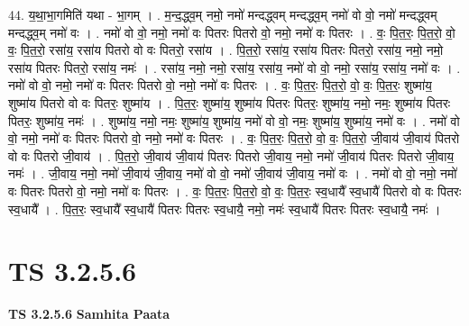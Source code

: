 \documentclass[17pt]{extarticle}
\begin{document}
44. य॒था॒भा॒गमिति॑ यथा - भा॒गम् । . म॒न्द॒द्ध्व॒म् नमो॒ नमो॑ मन्दद्ध्वम् मन्दद्ध्व॒म् नमो॑ वो वो॒ नमो॑ मन्दद्ध्वम् मन्दद्ध्व॒म् नमो॑ वः । . नमो॑ वो वो॒ नमो॒ नमो॑ वः पितरः पितरो वो॒ नमो॒ नमो॑ वः पितरः । . वः॒ पि॒त॒रः॒ पि॒त॒रो॒ वो॒ वः॒ पि॒त॒रो॒ रसा॑य॒ रसा॑य पितरो वो वः पितरो॒ रसा॑य । . पि॒त॒रो॒ रसा॑य॒ रसा॑य पितरः पितरो॒ रसा॑य॒ नमो॒ नमो॒ रसा॑य पितरः पितरो॒ रसा॑य॒ नमः॑ । . रसा॑य॒ नमो॒ नमो॒ रसा॑य॒ रसा॑य॒ नमो॑ वो वो॒ नमो॒ रसा॑य॒ रसा॑य॒ नमो॑ वः । . नमो॑ वो वो॒ नमो॒ नमो॑ वः पितरः पितरो वो॒ नमो॒ नमो॑ वः पितरः । . वः॒ पि॒त॒रः॒ पि॒त॒रो॒ वो॒ वः॒ पि॒त॒रः॒ शुष्मा॑य॒ शुष्मा॑य पितरो वो वः पितरः॒ शुष्मा॑य । . पि॒त॒रः॒ शुष्मा॑य॒ शुष्मा॑य पितरः पितरः॒ शुष्मा॑य॒ नमो॒ नमः॒ शुष्मा॑य पितरः पितरः॒ शुष्मा॑य॒ नमः॑ । . शुष्मा॑य॒ नमो॒ नमः॒ शुष्मा॑य॒ शुष्मा॑य॒ नमो॑ वो वो॒ नमः॒ शुष्मा॑य॒ शुष्मा॑य॒ नमो॑ वः । . नमो॑ वो वो॒ नमो॒ नमो॑ वः पितरः पितरो वो॒ नमो॒ नमो॑ वः पितरः । . वः॒ पि॒त॒रः॒ पि॒त॒रो॒ वो॒ वः॒ पि॒त॒रो॒ जी॒वाय॑ जी॒वाय॑ पितरो वो वः पितरो जी॒वाय॑ । . पि॒त॒रो॒ जी॒वाय॑ जी॒वाय॑ पितरः पितरो जी॒वाय॒ नमो॒ नमो॑ जी॒वाय॑ पितरः पितरो जी॒वाय॒ नमः॑ । . जी॒वाय॒ नमो॒ नमो॑ जी॒वाय॑ जी॒वाय॒ नमो॑ वो वो॒ नमो॑ जी॒वाय॑ जी॒वाय॒ नमो॑ वः । . नमो॑ वो वो॒ नमो॒ नमो॑ वः पितरः पितरो वो॒ नमो॒ नमो॑ वः पितरः । . वः॒ पि॒त॒रः॒ पि॒त॒रो॒ वो॒ वः॒ पि॒त॒रः॒ स्व॒धायै᳚ स्व॒धायै॑ पितरो वो वः पितरः स्व॒धायै᳚ । . पि॒त॒रः॒ स्व॒धायै᳚ स्व॒धायै॑ पितरः पितरः स्व॒धायै॒ नमो॒ नमः॑ स्व॒धायै॑ पितरः पितरः स्व॒धायै॒ नमः॑ । \newline
\pagebreak
{}

\section{ TS 3.2.5.6 }

\textbf{TS 3.2.5.6 } \newline
\textbf{Samhita Paata} \newline
\end{document}
